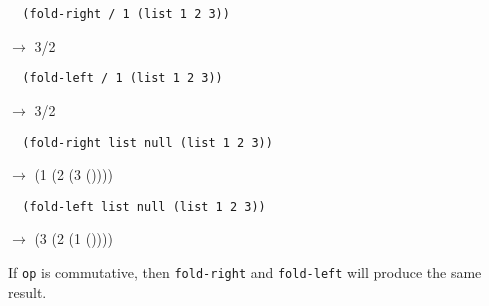 \documentclass[a4paper,12pt]{article}
\begin{document}
\begin{lstlisting}
  (fold-right / 1 (list 1 2 3))
\end{lstlisting}
$\rightarrow$ 3/2
\begin{lstlisting}
  (fold-left / 1 (list 1 2 3))
\end{lstlisting}
$\rightarrow$ 3/2
\begin{lstlisting}
  (fold-right list null (list 1 2 3))
\end{lstlisting}
$\rightarrow$ (1 (2 (3 ())))
\begin{lstlisting}
  (fold-left list null (list 1 2 3))
\end{lstlisting}
$\rightarrow$ (3 (2 (1 ())))

If \lstinline!op! is commutative, then \lstinline!fold-right! and
\lstinline!fold-left! will produce the same result.
\end{document}
